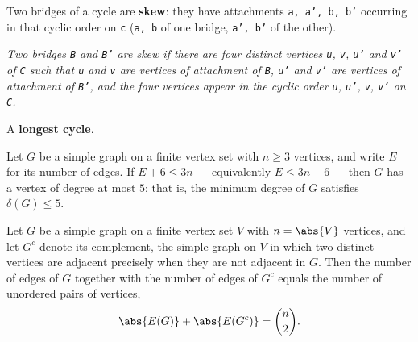 \begin{definition}
\label{SimpleGraph.Skew}
\leanok
{}
Two bridges of a cycle are \textbf{skew}: they have attachments \texttt{a, a', b, b'}
occurring in
that cyclic order on \texttt{c} (\texttt{a, b} of one bridge, \texttt{a', b'} of the
other).

\emph{Two bridges \texttt{B} and \texttt{B'} are skew if
there are four distinct vertices \texttt{u}, \texttt{v}, \texttt{u'} and \texttt{v'} of
\texttt{C} such that \texttt{u} and
\texttt{v} are vertices of attachment of \texttt{B}, \texttt{u'} and \texttt{v'} are vertices of attachment of
\texttt{B'}, and the four vertices appear in the cyclic order \texttt{u}, \texttt{u'}, \texttt{v}, \texttt{v'} on
\texttt{C}.}
\end{definition}

\begin{definition}
\label{SimpleGraph.Walk.IsLongestCycle}
\leanok
A \textbf{longest cycle}.
\end{definition}

\begin{theorem}
\label{SimpleGraph.minDegree_le_five_of_card_edge_le}
\leanok
Let $G$ be a simple graph on a finite vertex set with $n \ge 3$ vertices, and write $E$
for its number of edges. If $E + 6 \le 3n$ — equivalently $E \le 3n - 6$ — then $G$ has
a vertex of degree at most $5$; that is, the minimum degree of $G$ satisfies $\delta(G)
\le 5$.
\end{theorem}

\begin{theorem}
\label{SimpleGraph.card_edgeFinset_add_card_edgeFinset_compl}
\leanok
Let $G$ be a simple graph on a finite vertex set $V$ with $n = \abs{V}$ vertices, and
let $G^{c}$ denote its complement, the simple graph on $V$ in which two distinct
vertices are adjacent precisely when they are not adjacent in $G$. Then the number of
edges of $G$ together with the number of edges of $G^{c}$ equals the number of unordered
pairs of vertices, \[ \abs{E(G)} + \abs{E(G^{c})} = \binom{n}{2}. \]
\end{theorem}

